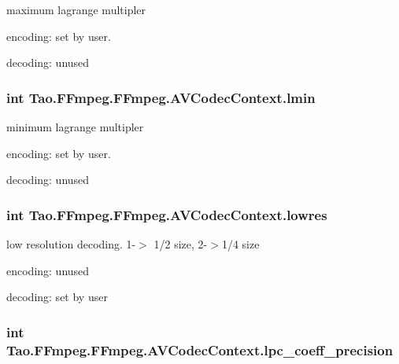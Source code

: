 \label{struct_tao_1_1_f_fmpeg_1_1_f_fmpeg_1_1_a_v_codec_context_a286fe23442a5234acb944d210b518795}
maximum lagrange multipler
\begin{DoxyItemize}
\item encoding: set by user.
\item decoding: unused 
\end{DoxyItemize}\hypertarget{struct_tao_1_1_f_fmpeg_1_1_f_fmpeg_1_1_a_v_codec_context_a5834efc6fca54e560f6f8c4a5c7513fa}{
\subsubsection[{lmin}]{\setlength{\rightskip}{0pt plus 5cm}int {\bf Tao.FFmpeg.FFmpeg.AVCodecContext.lmin}}}
\label{struct_tao_1_1_f_fmpeg_1_1_f_fmpeg_1_1_a_v_codec_context_a5834efc6fca54e560f6f8c4a5c7513fa}
minimum lagrange multipler
\begin{DoxyItemize}
\item encoding: set by user.
\item decoding: unused 
\end{DoxyItemize}\hypertarget{struct_tao_1_1_f_fmpeg_1_1_f_fmpeg_1_1_a_v_codec_context_a9bc5f49b3ed32fe8b63480c98620bffa}{
\subsubsection[{lowres}]{\setlength{\rightskip}{0pt plus 5cm}int {\bf Tao.FFmpeg.FFmpeg.AVCodecContext.lowres}}}
\label{struct_tao_1_1_f_fmpeg_1_1_f_fmpeg_1_1_a_v_codec_context_a9bc5f49b3ed32fe8b63480c98620bffa}
low resolution decoding. 1-\/$>$ 1/2 size, 2-\/$>$1/4 size
\begin{DoxyItemize}
\item encoding: unused
\item decoding: set by user 
\end{DoxyItemize}\hypertarget{struct_tao_1_1_f_fmpeg_1_1_f_fmpeg_1_1_a_v_codec_context_a9e10bf5598d185c7df9399751a1141cf}{
\subsubsection[{lpc\_\-coeff\_\-precision}]{\setlength{\rightskip}{0pt plus 5cm}int {\bf Tao.FFmpeg.FFmpeg.AVCodecContext.lpc\_\-coeff\_\-precision}}}
